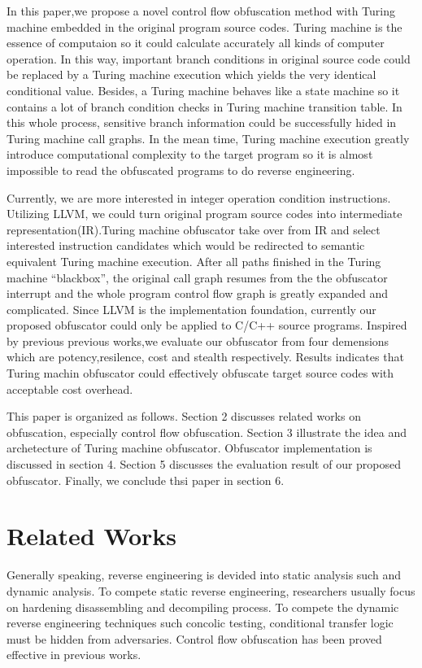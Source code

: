 \documentclass[lnicst]{svmultln}
\begin{document}
In this paper,we propose a novel control flow obfuscation method with Turing machine embedded in the original program source codes. Turing machine is the essence of computaion so it could calculate accurately all kinds of computer operation. In this way, important branch conditions in original source code could be replaced by a Turing machine execution which yields the very identical conditional value. Besides, a Turing machine behaves like a state machine so it contains a lot of branch condition checks in Turing machine transition table. In this whole process, sensitive branch information could be successfully hided in Turing machine call graphs. In the mean time, Turing machine execution greatly introduce computational complexity to the target program so it is almost impossible to read the obfuscated programs to do reverse engineering. 

Currently, we are more interested in integer operation condition instructions. Utilizing LLVM, we could turn original program source codes into intermediate representation(IR).Turing machine obfuscator take over from IR and select interested instruction candidates which would be redirected to semantic equivalent Turing machine execution. After all paths finished in the Turing machine ``blackbox'', the original call graph resumes from the the obfuscator interrupt and the whole program control flow graph is greatly expanded and complicated. Since LLVM is the implementation foundation, currently our proposed obfuscator could only be applied to C/C++ source programs. Inspired by previous previous works\cite{Collberg},we evaluate our obfuscator from four demensions which are potency,resilence, cost and stealth respectively. Results indicates that Turing machin obfuscator could effectively obfuscate target source codes with acceptable cost overhead.

This paper is organized as follows. Section 2 discusses related works on obfuscation, especially control flow obfuscation. Section 3 illustrate the idea and archetecture of Turing machine obfuscator. Obfuscator implementation is discussed in section 4. Section 5 discusses the evaluation result of our proposed obfuscator. Finally, we conclude thsi paper in section 6.


%
\section{Related Works}
%
Generally speaking, reverse engineering is devided into static analysis such and dynamic analysis. To compete static reverse engineering, researchers usually focus on hardening disassembling and decompiling process. To compete the dynamic reverse engineering techniques such concolic testing, conditional transfer logic must be hidden from adversaries. Control flow obfuscation has been proved effective in previous works.
\end{document}

